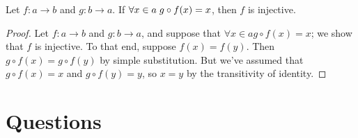 \documentclass{article}
\begin{document}
\begin{lemma}
Let $f: a \rightarrow b$ and $g: b \rightarrow a$. If $\forall x \in a \hspace{0.1cm} g \circ f(x) = x$, then $f$ is injective. \end{lemma}
\begin{proof}
Let $f: a \rightarrow b$ and $g: b \rightarrow a$, and suppose that $\forall x \in a g \circ f(x) = x$; we show that $f$ is injective. To that end, suppose $f(x) = f(y)$. Then $g \circ f(x) = g \circ f(y)$ by simple substitution. But we've assumed that $g \circ f(x) = x$ and $g \circ f(y) = y$, so $x = y$ by the transitivity of identity.
\end{proof}
\section{Questions}
\end{document}
